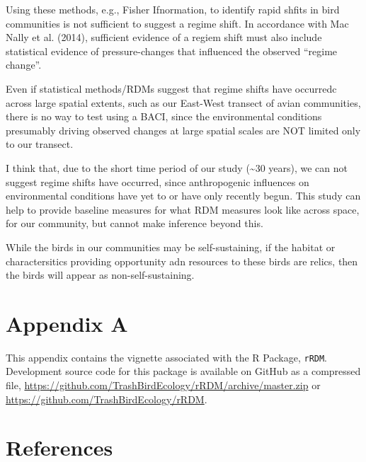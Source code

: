 \documentclass[12pt,twoside,openany]{reedthesis}
\begin{document}
Using these methods, e.g., Fisher Ifnormation, to identify rapid shfits
in bird communities is not sufficient to suggest a regime shift. In
accordance with Mac Nally et al. (2014), sufficient evidence of a regiem
shift must also include statistical evidence of pressure-changes that
influenced the observed ``regime change''.

Even if statistical methods/RDMs suggest that regime shifts have
occurredc across large spatial extents, such as our East-West transect
of avian communities, there is no way to test using a BACI, since the
environmental conditions presumably driving observed changes at large
spatial scales are NOT limited only to our transect.

I think that, due to the short time period of our study
(\textasciitilde{}30 years), we can not suggest regime shifts have
occurred, since anthropogenic influences on environmental conditions
have yet to or have only recently begun. This study can help to provide
baseline measures for what RDM measures look like across space, for our
community, but cannot make inference beyond this.

While the birds in our communities may be self-sustaining, if the
habitat or charactersitics providing opportunity adn resources to these
birds are relics, then the birds will appear as non-self-sustaining.

\appendix

\chapter*{Appendix A}\label{rRDM}

This appendix contains the vignette associated with the R Package,
\texttt{rRDM}. Development source code for this package is available on
GitHub as a compressed file,
\url{https://github.com/TrashBirdEcology/rRDM/archive/master.zip} or
\url{https://github.com/TrashBirdEcology/rRDM}.

\backmatter

\chapter*{References}\label{references}


\noindent

\setlength{\parindent}{-0.20in} \setlength{\leftskip}{0.20in}
\setlength{\parskip}{8pt}
\end{document}
